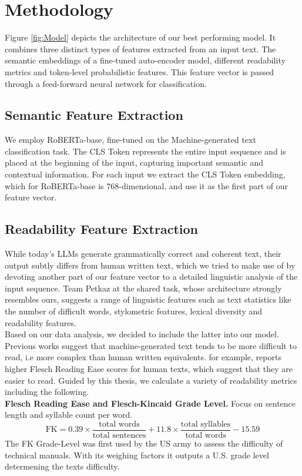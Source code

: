 \documentclass[11pt]{article}
\begin{document}
\section{Methodology}

Figure \ref{fig:Model} depicts the architecture of our best performing model. It combines three distinct types of features extracted 
from an input text. The semantic embeddings of a fine-tuned auto-encoder model, different readability metrics and 
token-level probabilistic features. This feature vector is passed through a feed-forward neural network for 
classification. 
\subsection{Semantic Feature Extraction}
We employ RoBERTa-base, fine-tuned on the Machine-generated text classification task. The CLS Token represents the entire 
input sequence and is placed at the beginning of the input, capturing important semantic and contextual information. For 
each input we extract the CLS Token embedding, which for RoBERTa-base is 768-dimensional, and use it as the first part of our 
feature vector. 
\subsection{Readability Feature Extraction}
While today’s LLMs generate grammatically correct and coherent text, their output subtly differs from human written text, 
which we tried to make use of by devoting another part of our feature vector to a detailed linguistic analysis of the 
input sequence. Team Petkaz at the shared task, whose architecture strongly resembles ours, suggests a range of 
linguistic features such as text statistics like the number of difficult words, stylometric features, lexical diversity 
and readability features.\\ 
Based on our data analysis, we decided to include the latter into our model. Previous works suggest that 
machine-generated text tends to be more difficult to read, i.e more complex than human written equivalents. \cite{georgiou2024differentiating} for example, 
reports higher Flesch Reading Ease scores for human texts, which suggest that they are easier to read.
Guided by this thesis, we calculate a variety of readability metrics including the following.\\

\textbf{Flesch Reading Ease and Flesch-Kincaid Grade Level.} Focus on sentence length and syllable count per word.
{\small
\[
    \text{FK} = 0.39 \times \frac{\text{total words}}{\text{total sentences}} + 11.8 \times \frac{\text{total syllables}}{\text{total words}} - 15.59
\]}
The FK Grade-Level was first used by the US army to assess the difficulty of technical manuals. With its weighing factors it 
outputs a U.S. grade level determening the texts difficulty.\\ 
\end{document}
